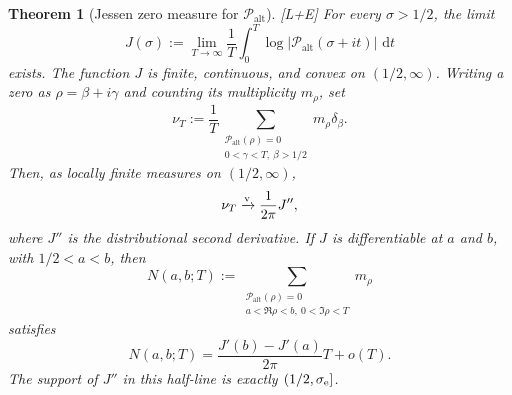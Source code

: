 \documentclass[11pt]{article}
\newtheorem{theorem}{Theorem}[section]
\theoremstyle{definition}
\theoremstyle{remark}
\newcommand{\Palt}{\mathcal P_{\mathrm{alt}}}
\newcommand{\status}[1]{\textnormal{\textcolor{accent}{\footnotesize[#1]}}}
\newcommand{\dd}{\,\mathrm d}
\begin{document}
\begin{theorem}[Jessen zero measure for $\Palt$]
\label{thm:Palt-Jessen-measure}
\status{L+E}
For every $\sigma>1/2$, the limit
\begin{equation}\label{eq:Palt-Jessen-function}
 J(\sigma):=\lim_{T\to\infty}\frac1T
 \int_0^T\log|\Palt(\sigma+it)|\,\dd t
\end{equation}
exists.  The function $J$ is finite, continuous, and convex on $(1/2,\infty)$.
Writing a zero as $\rho=\beta+i\gamma$ and counting its multiplicity $m_\rho$, set
\[
 \nu_T:=\frac1T
 \sum_{\substack{\Palt(\rho)=0\\0<\gamma<T,\ \beta>1/2}}
 m_\rho\delta_\beta.
\]
Then, as locally finite measures on $(1/2,\infty)$,
\begin{equation}\label{eq:Palt-Jessen-vague}
 \nu_T\xrightarrow{\rm v}\frac1{2\pi}J'',
\end{equation}
where $J''$ is the distributional second derivative.  If $J$ is differentiable at
$a$ and $b$, with $1/2<a<b$, then
\[
 N(a,b;T):=
 \sum_{\substack{\Palt(\rho)=0\\a<\Re\rho<b,\ 0<\Im\rho<T}}m_\rho
\]
satisfies
\begin{equation}\label{eq:Palt-exact-zero-density}
 N(a,b;T)=\frac{J'(b)-J'(a)}{2\pi}T+o(T).
\end{equation}
The support of $J''$ in this half-line is exactly $(1/2,\sigma_{\rm e}]$.
\end{theorem}
\end{document}
